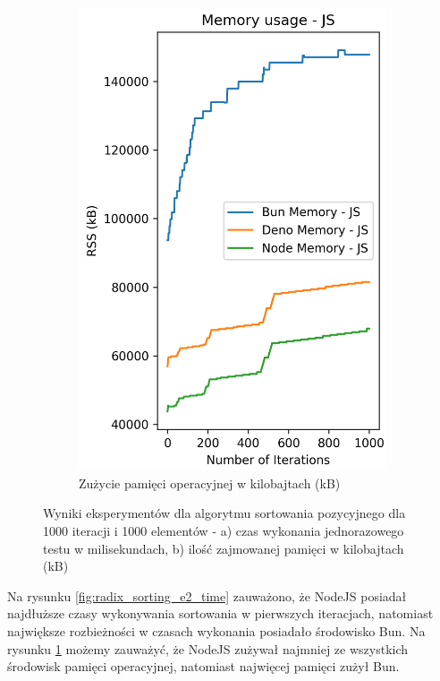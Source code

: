 \begin{figure}[H]
\begin{subfigure}[b]{0.44\textwidth}
  \end{subfigure}
  \begin{subfigure}[b]{0.44\textwidth}
    \centering
    \includegraphics[width=\textwidth]{Figures/sorting/sorting_radix_1000_1000_js_memory.png}
    \caption{Zużycie pamięci operacyjnej w kilobajtach (kB)}
    \label{fig:radix_sorting_e2_memory}
  \end{subfigure}
  \caption{Wyniki eksperymentów dla algorytmu sortowania pozycyjnego dla 1000 iteracji i 1000 elementów - a) czas wykonania jednorazowego testu w milisekundach, b) ilość zajmowanej pamięci w kilobajtach (kB)}
  \label{fig:radix_sorting_e2}
\end{figure}

Na rysunku \ref{fig:radix_sorting_e2_time} zauważono, że NodeJS posiadał najdłuższe czasy wykonywania sortowania w pierwszych iteracjach, natomiast największe rozbieżności w czasach wykonania posiadało środowisko Bun. Na rysunku \ref{fig:radix_sorting_e2_memory} możemy zauważyć, że NodeJS zużywał najmniej ze wszystkich środowisk pamięci operacyjnej, natomiast najwięcej pamięci zużył Bun.

